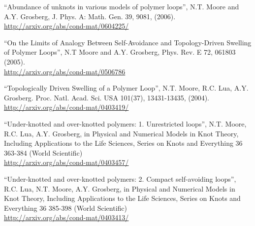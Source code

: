 \documentclass[margin,line,letterpaper]{res}
\begin{document}
\begin{resume}
``Abundance of unknots in various models of polymer loops'',
N.T. Moore and A.Y. Grosberg,
J. Phys. A: Math. Gen. 39, 9081, (2006).\\
\url{http://arxiv.org/abs/cond-mat/0604225/}

``On the Limits of Analogy Between Self-Avoidance and Topology-Driven Swelling of Polymer Loops'',
N.T Moore and A.Y. Grosberg,
Phys. Rev. E 72, 061803 (2005).\\
\url{http://arxiv.org/abs/cond-mat/0506786}

``Topologically Driven Swelling of a Polymer Loop'',
N.T. Moore, R.C. Lua, A.Y. Grosberg.
Proc. Natl. Acad. Sci. USA 101(37), 13431-13435, (2004).\\
\url{http://arxiv.org/abs/cond-mat/0403419/}

``Under-knotted and over-knotted polymers: 1. Unrestricted loops'',
N.T. Moore, R.C. Lua, A.Y. Grosberg,
in Physical and Numerical Models in Knot Theory, Including Applications to the Life Sciences,
        Series on  Knots and Everything 36 363-384 (World Scientific)\\
\url{http://arxiv.org/abs/cond-mat/0403457/}

``Under-knotted and over-knotted polymers: 2. Compact self-avoiding loops'',
R.C. Lua, N.T. Moore, A.Y. Grosberg,
in Physical and Numerical Models in Knot Theory, Including Applications to the Life Sciences,
        Series on  Knots and Everything 36 385-398 (World Scientific)\\
\url{http://arxiv.org/abs/cond-mat/0403413/}







\end{resume}
\end{document}
